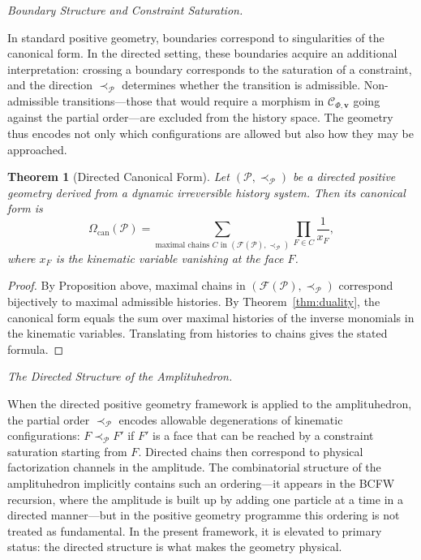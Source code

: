 \documentclass[12pt, oneside]{amsart}
\theoremstyle{plain}
\newtheorem{theorem}{Theorem}[section]
\theoremstyle{definition}
\theoremstyle{remark}
\newcommand{\CF}{\Omega_{\mathrm{can}}}
\newcommand{\Ccat}{\mathcal{C}_{\Phi,\mathbf{v}}}
\begin{document}
\medskip\noindent\textit{Boundary Structure and Constraint Saturation.}

In standard positive geometry, boundaries correspond to singularities of the canonical form. In the directed setting, these boundaries acquire an additional interpretation: crossing a boundary corresponds to the saturation of a constraint, and the direction $\prec_{\mathcal{P}}$ determines whether the transition is admissible. Non-admissible transitions---those that would require a morphism in $\Ccat$ going against the partial order---are excluded from the history space. The geometry thus encodes not only which configurations are allowed but also how they may be approached.

\begin{theorem}[Directed Canonical Form]
\label{thm:directed-form}
Let $(\mathcal{P}, \prec_{\mathcal{P}})$ be a directed positive geometry derived from a dynamic irreversible history system. Then its canonical form is
\[
  \CF(\mathcal{P}) = \sum_{\text{maximal chains } C \text{ in } (\mathcal{F}(\mathcal{P}), \prec_{\mathcal{P}})} \prod_{F \in C} \frac{1}{x_F},
\]
where $x_F$ is the kinematic variable vanishing at the face $F$.
\end{theorem}

\begin{proof}
By Proposition above, maximal chains in $(\mathcal{F}(\mathcal{P}), \prec_{\mathcal{P}})$ correspond bijectively to maximal admissible histories. By Theorem~\ref{thm:duality}, the canonical form equals the sum over maximal histories of the inverse monomials in the kinematic variables. Translating from histories to chains gives the stated formula.
\end{proof}

\medskip\noindent\textit{The Directed Structure of the Amplituhedron.}

When the directed positive geometry framework is applied to the amplituhedron, the partial order $\prec_{\mathcal{P}}$ encodes allowable degenerations of kinematic configurations: $F \prec_{\mathcal{P}} F'$ if $F'$ is a face that can be reached by a constraint saturation starting from $F$. Directed chains then correspond to physical factorization channels in the amplitude. The combinatorial structure of the amplituhedron implicitly contains such an ordering---it appears in the BCFW recursion, where the amplitude is built up by adding one particle at a time in a directed manner---but in the positive geometry programme this ordering is not treated as fundamental. In the present framework, it is elevated to primary status: the directed structure is what makes the geometry physical.
\end{document}
